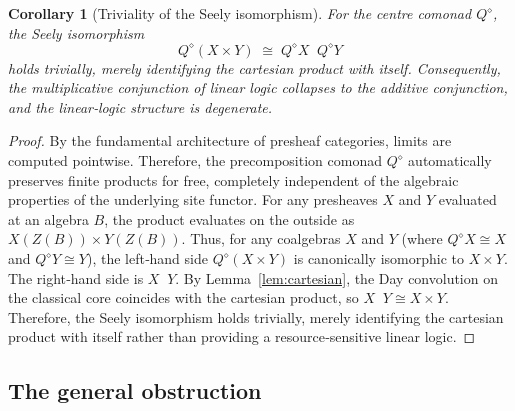 \documentclass[12pt,a4paper]{article}
\theoremstyle{plain}
\newtheorem{corollary}[theorem]{Corollary}
\theoremstyle{definition}
\DeclareMathOperator{\Day}{\otimes_{\mathrm{Day}}}
\begin{document}
\begin{corollary}[Triviality of the Seely isomorphism]\label{cor:seely-trivial}
For the centre comonad \(Q^{\diamond}\), the Seely isomorphism
\[
Q^{\diamond}(X\times Y) \;\cong\; Q^{\diamond}X \Day Q^{\diamond}Y
\]
holds trivially, merely identifying the cartesian product with itself.  Consequently, the multiplicative conjunction of linear logic collapses to the additive conjunction, and the linear‑logic structure is degenerate.
\end{corollary}

\begin{proof}
By the fundamental architecture of presheaf categories, limits are computed pointwise.  Therefore, the precomposition comonad \(Q^{\diamond}\) automatically preserves finite products for free, completely independent of the algebraic properties of the underlying site functor.  For any presheaves \(X\) and \(Y\) evaluated at an algebra \(B\), the product evaluates on the outside as \(X(Z(B)) \times Y(Z(B))\).  Thus, for any coalgebras \(X\) and \(Y\) (where \(Q^{\diamond}X \cong X\) and \(Q^{\diamond}Y \cong Y\)), the left‑hand side \(Q^{\diamond}(X\times Y)\) is canonically isomorphic to \(X \times Y\).  The right‑hand side is \(X \Day Y\).  By Lemma~\ref{lem:cartesian}, the Day convolution on the classical core coincides with the cartesian product, so \(X \Day Y \cong X \times Y\).  Therefore, the Seely isomorphism holds trivially, merely identifying the cartesian product with itself rather than providing a resource‑sensitive linear logic. \qedhere
\end{proof}

\subsection{The general obstruction}
\label{sec:obstruction}
\end{document}
